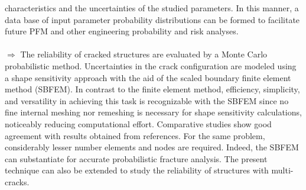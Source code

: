 \documentclass[12pt]{article}
\begin{document}
characteristics and the uncertainties of the studied
parameters. In this manner, a data base of input parameter probability distributions can be formed to
facilitate future PFM and other engineering probability and risk analyses.
\\\\$\Rightarrow$ The reliability of cracked structures are evaluated by a Monte Carlo probabilistic method. Uncertainties in the crack configuration are modeled using a shape sensitivity approach with the aid of the scaled boundary finite element method
(SBFEM). In contrast to the finite element method, efficiency, simplicity, and versatility in achieving this task is recognizable
with the SBFEM since no fine internal meshing nor remeshing is necessary for shape sensitivity calculations, noticeably
reducing computational effort. Comparative studies show good agreement with results obtained from references. For the
same problem, considerably lesser number elements and nodes are required. Indeed, the SBFEM can substantiate for accurate probabilistic fracture analysis. The present technique can also be extended to study the reliability of structures with
multi-cracks.
\end{document}
